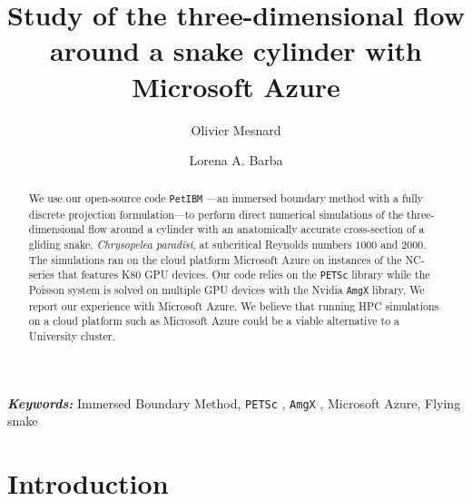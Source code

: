 \documentclass[12pt]{article}
\newcommand{\petibm}{\texttt{PetIBM} }
\newcommand{\petsc}{\texttt{PETSc} }
\newcommand{\amgx}{\texttt{AmgX} }
\providecommand{\keywords}[1]{\textbf{\textit{Keywords:}} #1}
\begin{document}
\title{Study of the three-dimensional flow around a snake cylinder with Microsoft Azure}

\author[1]{Olivier Mesnard}
\author[1]{Lorena A. Barba}
\maketitle

\begin{abstract}
We use our open-source code \petibm---an immersed boundary method with a fully discrete projection formulation---to perform direct numerical simulations of the three-dimensional flow around a cylinder with an anatomically accurate cross-section of a gliding snake, \textit{Chrysopelea paradisi}, at subcritical Reynolds numbers $1000$ and $2000$.
The simulations ran on the cloud platform Microsoft Azure on instances of the NC-series that features K80 GPU devices.
Our code relies on the \petsc library while the Poisson system is solved on multiple GPU devices with the Nvidia \amgx library.
We report our experience with Microsoft Azure.
We believe that running HPC simulations on a cloud platform such as Microsoft Azure could be a viable alternative to a University cluster.
\end{abstract}

\keywords{Immersed Boundary Method, \petsc, \amgx, Microsoft Azure, Flying snake}

\linenumbers

\section{Introduction}
\end{document}

